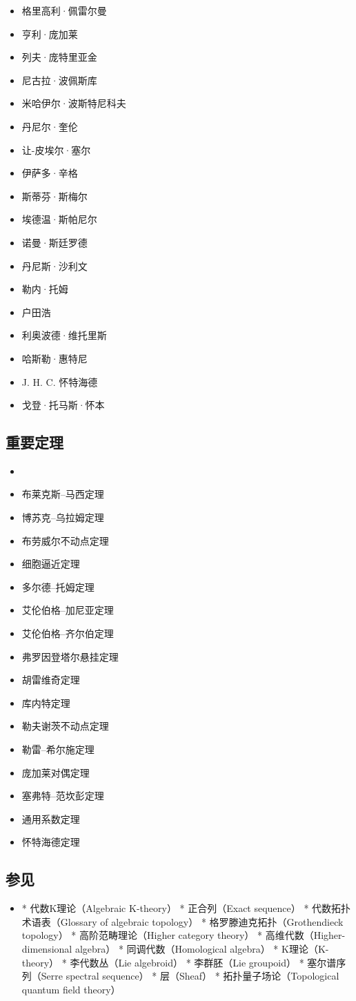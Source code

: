 \begin{itemize}
\item 格里高利·佩雷尔曼
\item 亨利·庞加莱
\item 列夫·庞特里亚金
\item 尼古拉·波佩斯库
\item 米哈伊尔·波斯特尼科夫
\item 丹尼尔·奎伦
\item 让-皮埃尔·塞尔
\item 伊萨多·辛格
\item 斯蒂芬·斯梅尔
\item 埃德温·斯帕尼尔
\item 诺曼·斯廷罗德
\item 丹尼斯·沙利文
\item 勒内·托姆
\item 户田浩
\item 利奥波德·维托里斯
\item 哈斯勒·惠特尼
\item J. H. C. 怀特海德
\item 戈登·托马斯·怀本
\end{itemize}
\subsection{重要定理}


\begin{itemize}
\item \item 布莱克斯–马西定理
\item 博苏克–乌拉姆定理
\item 布劳威尔不动点定理
\item 细胞逼近定理
\item 多尔德–托姆定理
\item 艾伦伯格–加尼亚定理
\item 艾伦伯格–齐尔伯定理
\item 弗罗因登塔尔悬挂定理
\item 胡雷维奇定理
\item 库内特定理
\item 勒夫谢茨不动点定理
\item 勒雷–希尔施定理
\item 庞加莱对偶定理
\item 塞弗特–范坎彭定理
\item 通用系数定理
\item 怀特海德定理
\end{itemize}
\subsection{参见}
\begin{itemize}
\item * 代数K理论（Algebraic K-theory）
* 正合列（Exact sequence）
* 代数拓扑术语表（Glossary of algebraic topology）
* 格罗滕迪克拓扑（Grothendieck topology）
* 高阶范畴理论（Higher category theory）
* 高维代数（Higher-dimensional algebra）
* 同调代数（Homological algebra）
* K理论（K-theory）
* 李代数丛（Lie algebroid）
* 李群胚（Lie groupoid）
* 塞尔谱序列（Serre spectral sequence）
* 层（Sheaf）
* 拓扑量子场论（Topological quantum field theory）

\end{itemize}